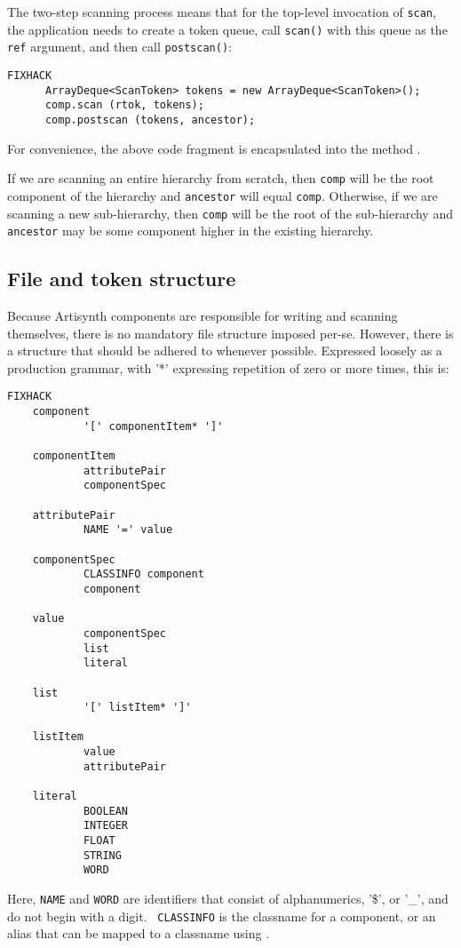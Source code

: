 \documentclass{article}
\begin{document}
The two-step scanning process means that for the top-level
invocation of {\tt scan}, the application 
needs to create a token queue, call {\tt scan()} with this
queue as the {\tt ref} argument, and then call {\tt postscan()}:
\begin{lstlisting}FIXHACK
      ArrayDeque<ScanToken> tokens = new ArrayDeque<ScanToken>();
      comp.scan (rtok, tokens);
      comp.postscan (tokens, ancestor);
\end{lstlisting}
For convenience, the above code fragment is encapsulated into the
method .

If we are scanning an entire hierarchy from scratch, then {\tt comp}
will be the root component of the hierarchy and {\tt ancestor} will
equal {\tt comp}. Otherwise, if we are scanning a new sub-hierarchy,
then {\tt comp} will be the root of the sub-hierarchy and {\tt
ancestor} may be some component higher in the existing hierarchy.

\subsection{File and token structure}
\label{fileStructureSec}

Because Artisynth components are responsible for writing and scanning
themselves, there is no mandatory file structure imposed per-se.
However, there is a structure that should be adhered to whenever
possible. Expressed loosely as a production grammar, with '*'
expressing repetition of zero or more times, this is:
\begin{lstlisting}FIXHACK
    component
            '[' componentItem* ']'
    
    componentItem
            attributePair
            componentSpec
    
    attributePair
            NAME '=' value
    
    componentSpec
            CLASSINFO component
            component
    
    value
            componentSpec
            list
            literal
    
    list
            '[' listItem* ']'
    
    listItem
            value
            attributePair
    
    literal
            BOOLEAN
            INTEGER
            FLOAT
            STRING
            WORD
\end{lstlisting}
Here, {\tt NAME} and {\tt WORD} are identifiers that consist of
alphanumerics, '\$', or '\_', and do not begin with a digit. {\tt
CLASSINFO} is the classname for a component, or an alias that can be
mapped to a classname using
.
\end{document}
